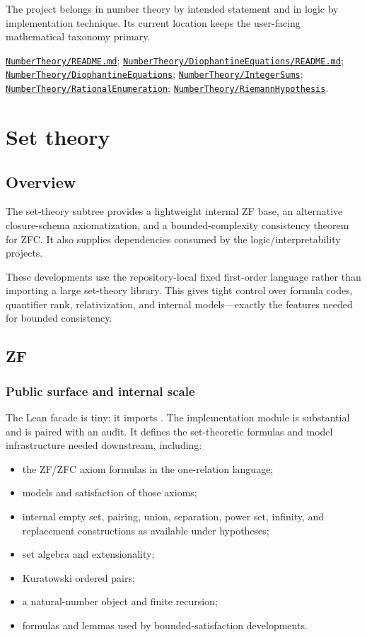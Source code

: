 \documentclass[
  10pt,
  a4paper,
  twoside,
  open=any,
  parskip=half,
  headings=big
]{scrreprt}
\newcommand{\CommitFull}{675d0a2ff0fc624fba199e006049016ba806f40a}
\newcommand{\RepoBlobBase}{https://github.com/VladimirReshetnikov/ProveIt/blob/\CommitFull/}
\newcommand{\RepoTreeBase}{https://github.com/VladimirReshetnikov/ProveIt/tree/\CommitFull/}
\newcommand{\RepoFile}[1]{%
  \href{\RepoBlobBase\detokenize{#1}}{\nolinkurl{#1}}}
\newcommand{\RepoDir}[1]{%
  \href{\RepoTreeBase\detokenize{#1}}{\nolinkurl{#1}}}
\newcommand{\code}[1]{\texttt{\detokenize{#1}}}
\begin{document}
The project belongs in number theory by intended statement and in logic by
implementation technique.  Its current location keeps the user-facing
mathematical taxonomy primary.

\begin{sourcebox}
\RepoFile{NumberTheory/README.md};
\RepoFile{NumberTheory/DiophantineEquations/README.md};
\RepoDir{NumberTheory/DiophantineEquations};
\RepoDir{NumberTheory/IntegerSums};
\RepoDir{NumberTheory/RationalEnumeration};
\RepoDir{NumberTheory/RiemannHypothesis}.
\end{sourcebox}

\chapter{Set theory}
\label{chap:set-theory}

\section{Overview}

The set-theory subtree provides a lightweight internal ZF base, an alternative
closure-schema axiomatization, and a bounded-complexity consistency theorem for
ZFC.  It also supplies dependencies consumed by the logic/interpretability
projects.

These developments use the repository-local fixed first-order language rather
than importing a large set-theory library.  This gives tight control over
formula codes, quantifier rank, relativization, and internal models---exactly
the features needed for bounded consistency.

\section{ZF}
\label{sec:zf}

\subsection{Public surface and internal scale}

The Lean facade is tiny: it imports \code{ZF.Zf}.  The implementation module is
substantial and is paired with an audit.  It defines the set-theoretic formulas
and model infrastructure needed downstream, including:

\begin{itemize}
  \item the ZF/ZFC axiom formulas in the one-relation language;
  \item models and satisfaction of those axioms;
  \item internal empty set, pairing, union, separation, power set, infinity,
        and replacement constructions as available under hypotheses;
  \item set algebra and extensionality;
  \item Kuratowski ordered pairs;
  \item a natural-number object and finite recursion;
  \item formulas and lemmas used by bounded-satisfaction developments.
\end{itemize}
\end{document}

